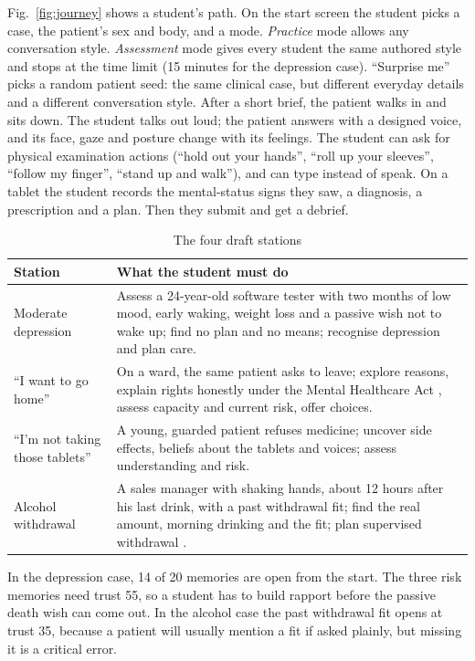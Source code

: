 \documentclass[conference]{IEEEtran}
\begin{document}
Fig.~\ref{fig:journey} shows a student's path. On the start screen the student picks a case, the patient's sex and body, and a mode. \emph{Practice} mode allows any conversation style. \emph{Assessment} mode gives every student the same authored style and stops at the time limit (15 minutes for the depression case). ``Surprise me'' picks a random patient seed: the same clinical case, but different everyday details and a different conversation
style. After a short brief, the patient walks in and sits down. The student talks out loud; the patient answers with a designed voice, and its face,
gaze and posture change with its feelings. The student can ask for physical examination actions (``hold out your hands'', ``roll up your sleeves'',
``follow my finger'', ``stand up and walk''), and can type instead of speak. On a tablet the student records the mental-status signs they saw, a
diagnosis, a prescription and a plan. Then they submit and get a debrief.

\begin{table}[t]
\caption{The four draft stations}
\label{tab:stations}
\centering
\scriptsize
\begin{tabularx}{\columnwidth}{@{}lY@{}}
\toprule
Station & What the student must do\\
\midrule
Moderate depression & Assess a 24-year-old software tester with two months of low mood, early waking, weight loss and a passive wish not to wake up; find no
plan and no means; recognise depression and plan care.\\
``I want to go home'' & On a ward, the same patient asks to leave; explore reasons, explain rights honestly under the Mental Healthcare Act
\cite{mhca2017}, assess capacity and current risk, offer choices.\\
``I'm not taking those tablets'' & A young, guarded patient refuses medicine; uncover side effects, beliefs about the tablets and voices; assess
understanding and risk.\\
Alcohol withdrawal & A sales manager with shaking hands, about 12 hours after his last drink, with a past withdrawal fit; find the real amount, morning
drinking and the fit; plan supervised withdrawal \cite{nice2010cg100}.\\
\bottomrule
\end{tabularx}
\end{table}

In the depression case, 14 of 20 memories are open from the start. The three risk memories need trust 55, so a student has to build rapport before the passive death wish can come out. In the alcohol case the past withdrawal fit opens
at trust 35, because a patient will usually mention a fit if asked plainly, but missing it is a critical error.
\end{document}
